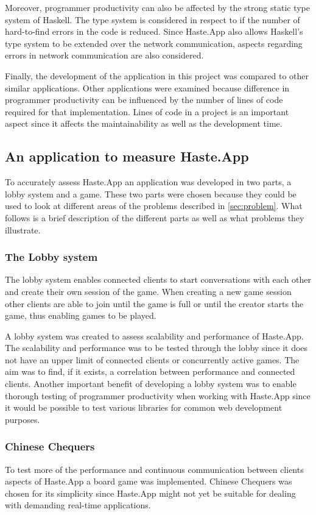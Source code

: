\documentclass[a4paper]{article}
\begin{document}
Moreover, programmer productivity can also be affected by the strong static type system of Haskell. The type system is considered in respect to if the number of hard-to-find errors in the code is reduced. Since Haste.App also allows Haskell's type system to be extended over the network communication, aspects regarding errors in network communication are also considered. 

Finally, the development of the application in this project was compared to other similar applications. Other applications were examined because difference in programmer productivity can be influenced by the number of lines of code required for that implementation. Lines of code in a project is an important aspect since it affects the maintainability as well as the development time.  

\subsection{An application to measure Haste.App}
To accurately assess Haste.App an application was developed in two parts, a lobby system and a game. These two parts were chosen because they could be used to look at different areas of the problems described in \cref{sec:problem}. What follows is a brief description of the different parts as well as what problems they illustrate.

\subsubsection{The Lobby system}
The lobby system enables connected clients to start conversations with each other and create their own session of the game. When creating a new game session other clients are able to join until the game is full or until the creator starts the game, thus enabling games to be played.

A lobby system was created to assess scalability and performance of Haste.App. The scalability and performance was to be tested through the lobby since it does not have an upper limit of connected clients or concurrently active games. The aim was to find, if it exists, a correlation between performance and connected clients. Another important benefit of developing a lobby system was to enable thorough testing of programmer productivity when working with Haste.App since it would be possible to test various libraries for common web development purposes.

\subsubsection{Chinese Chequers}
\label{sub:chinesecheckers}
To test more of the performance and continuous communication between clients aspects of Haste.App a board game was implemented. Chinese Chequers was chosen for its simplicity since Haste.App might not yet be suitable for dealing with demanding real-time applications.
\end{document}
